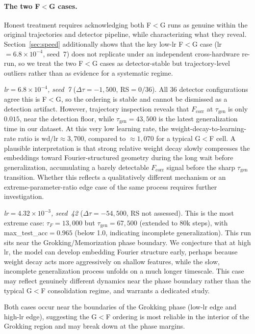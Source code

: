 \documentclass{article}
\newcommand{\taug}{\tau_{\mathrm{gen}}}
\newcommand{\tauf}{\tau_{F}}
\newcommand{\Dtau}{\Delta\tau}
\newcommand{\fcorr}{F_{\mathrm{corr}}}
\begin{document}
\paragraph{The two F$<$G cases.}
Honest treatment requires acknowledging both F$<$G runs as genuine
within the original trajectories and detector pipeline, while
characterizing what they reveal.
Section~\ref{sec:speed} additionally shows that the key low-lr
F$<$G case (lr$=6.8\!\times\!10^{-4}$, seed~7) does not replicate
under an independent cross-hardware re-run, so we treat the two
F$<$G cases as detector-stable but trajectory-level outliers
rather than as evidence for a systematic regime.

\textit{lr$=6.8\!\times\!10^{-4}$, seed~7} ($\Dtau=-1{,}500$,
RS$=0/36$).
All 36 detector configurations agree this is F$<$G, so the ordering
is stable and cannot be dismissed as a detection artifact.
However, trajectory inspection reveals that $\fcorr$ at $\taug$ is
only $0.015$, near the detection floor, while $\taug=43{,}500$
is the latest generalization time in our dataset.
At this very low learning rate, the weight-decay-to-learning-rate
ratio is $\mathrm{wd}/\mathrm{lr}\approx3{,}700$, compared to
$\approx1{,}070$ for a typical G$<$F cell.
A plausible interpretation is that strong relative weight decay
slowly compresses the embeddings toward Fourier-structured geometry
during the long wait before generalization, accumulating a barely
detectable $\fcorr$ signal before the sharp $\taug$ transition.
Whether this reflects a qualitatively different mechanism or an
extreme-parameter-ratio edge case of the same process requires
further investigation.

\textit{lr$=4.32\!\times\!10^{-3}$, seed~42} ($\Dtau=-54{,}500$,
RS not assessed).
This is the most extreme case: $\tauf=13{,}000$ but
$\taug=67{,}500$ (extended to 80k steps), with
max\_test\_acc$=0.965$ (below 1.0, indicating incomplete
generalization).
This run sits near the Grokking/Memorization phase boundary.
We conjecture that at high lr, the model can develop embedding
Fourier structure early, perhaps because weight decay acts more
aggressively on shallow features, while the slow, incomplete
generalization process unfolds on a much longer timescale.
This case may reflect genuinely different dynamics near the phase
boundary rather than the typical G$<$F consolidation regime, and
warrants a dedicated study.

Both cases occur near the boundaries of the Grokking phase
(low-lr edge and high-lr edge), suggesting the G$<$F ordering
is most reliable in the interior of the Grokking region
and may break down at the phase margins.
\end{document}
